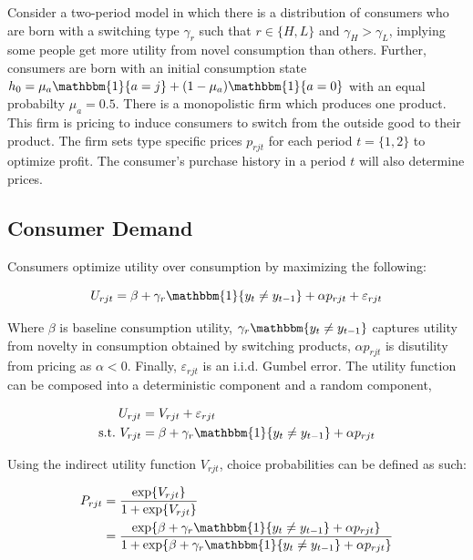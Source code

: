 \documentclass[12pt]{article}
\theoremstyle{definition}
\theoremstyle{remark}
\begin{document}
Consider a two-period model in which there is a distribution of consumers who are born with a switching type
$\gamma_r$ such that $r\in\{H,L\}$ and $\gamma_H>\gamma_L$, implying some people
get more utility from novel consumption than others. Further, consumers are born
with an initial consumption state $h_0 = \mu_a\mathbbm{1}\{a=j\} +
(1-\mu_a)\mathbbm{1}\{a=0\}$ with an equal probabilty $\mu_a=0.5$. There is a monopolistic firm which produces one product. This firm is pricing to
induce consumers to switch from the outside good to their product. The firm sets type specific prices $p_{rjt}$ for each period $t=\{1,2\}$ to optimize profit. The consumer's purchase history in a period $t$ will also determine prices. 


\subsection{Consumer Demand}
\label{subsec:model-demand}

Consumers optimize utility over consumption by maximizing the following:

\begin{equation}
  U_{rjt} = \beta + \gamma_r\mathbbm{1}\{y_t\ne y_{t-1}\} + \alpha p_{rjt} +
  \varepsilon_{rjt}
\end{equation}

Where $\beta$ is baseline consumption utility, $\gamma_r\mathbbm{y_t\ne y_{t-1}}$
captures utility from novelty in consumption obtained by switching products,
$\alpha p_{rjt}$ is disutility from pricing as $\alpha<0$. Finally,
$\varepsilon_{rjt}$ is an i.i.d. Gumbel error. The utility function can be
composed into a deterministic component and a random component,

\begin{align*}
  U_{rjt} &= V_{rjt} + \varepsilon_{rjt}\\
  \text{s.t.} \ V_{rjt} &= \beta + \gamma_r\mathbbm{1}\{y_t\ne y_{t-1}\} + \alpha p_{rjt}
\end{align*}

Using the indirect utility function $V_{rjt}$, choice probabilities can be
defined as such:

\begin{align*}
  P_{rjt} &= \frac{\exp\{V_{rjt}\}}{1 + \exp\{V_{rjt}\}} \\
  &= \frac{\exp\{\beta + \gamma_r\mathbbm{1}\{y_t\ne y_{t-1}\} + \alpha
  p_{rjt}\}}{1 + \exp\{\beta + \gamma_r\mathbbm{1}\{y_t\ne y_{t-1}\} + \alpha
  p_{rjt}\}}
\end{align*}
\end{document}
